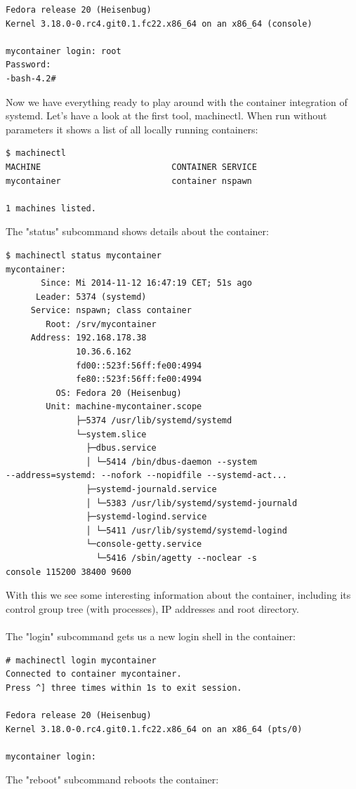 \documentclass[titlepage]{article}
\begin{document}
\begin{lstlisting}
Fedora release 20 (Heisenbug)
Kernel 3.18.0-0.rc4.git0.1.fc22.x86_64 on an x86_64 (console)

mycontainer login: root
Password:
-bash-4.2#
\end{lstlisting}
Now we have everything ready to play around with the container integration of systemd. Let's have a look at the first tool, machinectl. When run without parameters it shows a list of all locally running containers:
\begin{lstlisting}
$ machinectl
MACHINE                          CONTAINER SERVICE
mycontainer                      container nspawn

1 machines listed.
\end{lstlisting}
The "status" subcommand shows details about the container:
\begin{lstlisting}
$ machinectl status mycontainer
mycontainer:
       Since: Mi 2014-11-12 16:47:19 CET; 51s ago
      Leader: 5374 (systemd)
     Service: nspawn; class container
        Root: /srv/mycontainer
     Address: 192.168.178.38
              10.36.6.162
              fd00::523f:56ff:fe00:4994
              fe80::523f:56ff:fe00:4994
          OS: Fedora 20 (Heisenbug)
        Unit: machine-mycontainer.scope
              ├─5374 /usr/lib/systemd/systemd
              └─system.slice
                ├─dbus.service
                │ └─5414 /bin/dbus-daemon --system 
--address=systemd: --nofork --nopidfile --systemd-act...
                ├─systemd-journald.service
                │ └─5383 /usr/lib/systemd/systemd-journald
                ├─systemd-logind.service
                │ └─5411 /usr/lib/systemd/systemd-logind
                └─console-getty.service
                  └─5416 /sbin/agetty --noclear -s 
console 115200 38400 9600
\end{lstlisting}
With this we see some interesting information about the container, including its control group tree (with processes), IP addresses and root directory.
\\
\\
The "login" subcommand gets us a new login shell in the container:
\begin{lstlisting}
# machinectl login mycontainer
Connected to container mycontainer. 
Press ^] three times within 1s to exit session.

Fedora release 20 (Heisenbug)
Kernel 3.18.0-0.rc4.git0.1.fc22.x86_64 on an x86_64 (pts/0)

mycontainer login:
\end{lstlisting}
The "reboot" subcommand reboots the container:
\end{document}
